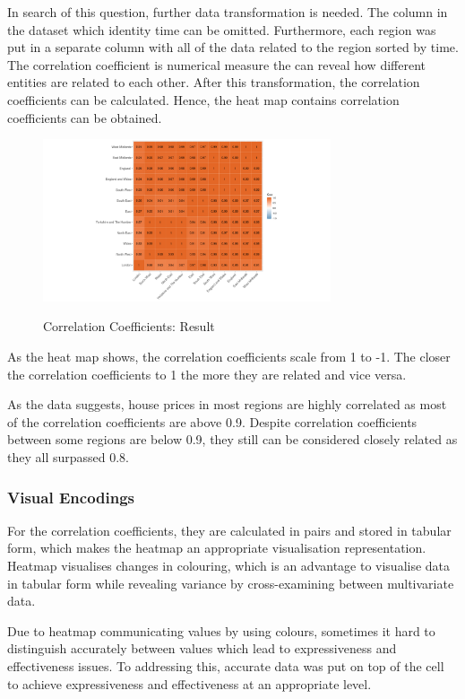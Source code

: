 \documentclass{article}
\begin{document}
In search of this question, further data transformation is needed. The column in the dataset which identity time can be omitted. Furthermore, each region was put in a separate column with all of the data related to the region sorted by time. The correlation coefficient is numerical measure the can reveal how different entities are related to each other. After this transformation, the correlation coefficients can be calculated. Hence, 
the heat map contains correlation coefficients can be obtained.

\begin{figure}[H]
  \begin{minipage}[b]{1.0\linewidth}
    \centering
    \centerline{\includegraphics[width=8.5cm]{corHeatMap}}
    \centerline{Correlation Coefficients: Result}\medskip
  \end{minipage}
\end{figure}

As the heat map shows, the correlation coefficients scale from 1 to -1. The closer the correlation coefficients 
to 1 the more they are related and vice versa.

As the data suggests, house prices in most regions are highly correlated as most of the correlation coefficients are above 0.9. Despite correlation coefficients between some regions are below 0.9, they still can be 
considered closely related as they all surpassed 0.8.

\subsubsection{Visual Encodings}
For the correlation coefficients, they are calculated in pairs and stored in tabular form, which makes the heatmap an appropriate visualisation representation. Heatmap visualises changes in colouring, which is an advantage to visualise data in tabular form while revealing variance by cross-examining between multivariate data.

Due to heatmap communicating values by using colours, sometimes it hard to distinguish accurately between values which lead to expressiveness and effectiveness issues. To addressing this, accurate data was put on top of the cell to achieve expressiveness and effectiveness at an appropriate level.
\end{document}
